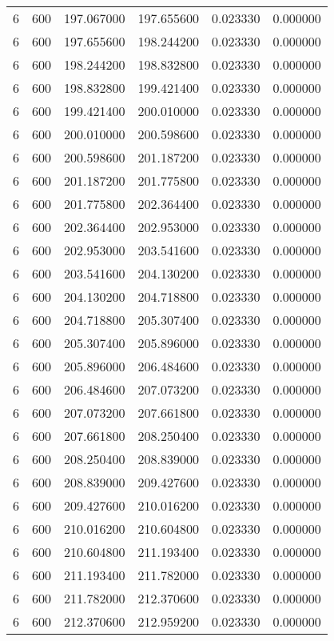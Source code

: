 \begin{longtable}{rrrrrr}
6 & 600 & 197.067000 & 197.655600 & 0.023330 & 0.000000 \\
6 & 600 & 197.655600 & 198.244200 & 0.023330 & 0.000000 \\
6 & 600 & 198.244200 & 198.832800 & 0.023330 & 0.000000 \\
6 & 600 & 198.832800 & 199.421400 & 0.023330 & 0.000000 \\
6 & 600 & 199.421400 & 200.010000 & 0.023330 & 0.000000 \\
6 & 600 & 200.010000 & 200.598600 & 0.023330 & 0.000000 \\
6 & 600 & 200.598600 & 201.187200 & 0.023330 & 0.000000 \\
6 & 600 & 201.187200 & 201.775800 & 0.023330 & 0.000000 \\
6 & 600 & 201.775800 & 202.364400 & 0.023330 & 0.000000 \\
6 & 600 & 202.364400 & 202.953000 & 0.023330 & 0.000000 \\
6 & 600 & 202.953000 & 203.541600 & 0.023330 & 0.000000 \\
6 & 600 & 203.541600 & 204.130200 & 0.023330 & 0.000000 \\
6 & 600 & 204.130200 & 204.718800 & 0.023330 & 0.000000 \\
6 & 600 & 204.718800 & 205.307400 & 0.023330 & 0.000000 \\
6 & 600 & 205.307400 & 205.896000 & 0.023330 & 0.000000 \\
6 & 600 & 205.896000 & 206.484600 & 0.023330 & 0.000000 \\
6 & 600 & 206.484600 & 207.073200 & 0.023330 & 0.000000 \\
6 & 600 & 207.073200 & 207.661800 & 0.023330 & 0.000000 \\
6 & 600 & 207.661800 & 208.250400 & 0.023330 & 0.000000 \\
6 & 600 & 208.250400 & 208.839000 & 0.023330 & 0.000000 \\
6 & 600 & 208.839000 & 209.427600 & 0.023330 & 0.000000 \\
6 & 600 & 209.427600 & 210.016200 & 0.023330 & 0.000000 \\
6 & 600 & 210.016200 & 210.604800 & 0.023330 & 0.000000 \\
6 & 600 & 210.604800 & 211.193400 & 0.023330 & 0.000000 \\
6 & 600 & 211.193400 & 211.782000 & 0.023330 & 0.000000 \\
6 & 600 & 211.782000 & 212.370600 & 0.023330 & 0.000000 \\
6 & 600 & 212.370600 & 212.959200 & 0.023330 & 0.000000 \\

\end{longtable}
